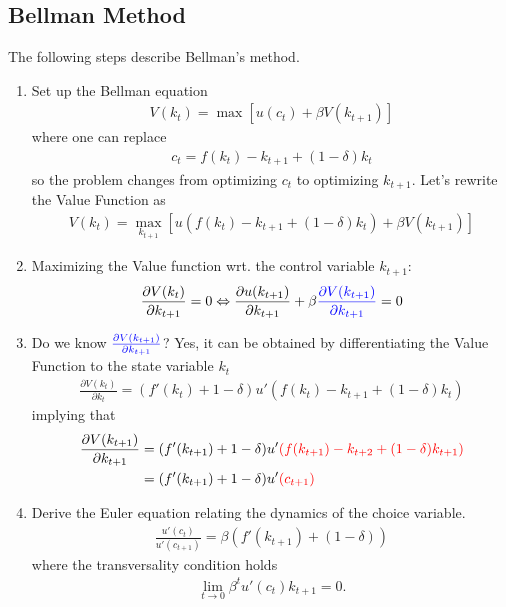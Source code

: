 \documentclass[11pt,a4paper]{book}
\newcommand{\red}[1]{\textcolor{red}{#1}}
\newcommand{\blue}[1]{\textcolor{blue}{#1}}
\theoremstyle{definition}\newtheorem{definition}{Definition}
\theoremstyle{definition}\newtheorem{fact}{Fact}
\theoremstyle{definition}\newtheorem{remark}{Remark}
\theoremstyle{definition}\newtheorem{ex}{Ex.}
\theoremstyle{definition}\newtheorem{project}{Project}
\theoremstyle{definition}\newtheorem{problem}{Problem}
\theoremstyle{definition}\newtheorem{example}{Example}
\numberwithin{theorem}{section}
\numberwithin{corollary}{chapter}
\numberwithin{assumption}{chapter}
\numberwithin{definition}{chapter}
\numberwithin{prop}{chapter}
\numberwithin{notation}{chapter}
\numberwithin{problem}{chapter}
\numberwithin{example}{chapter}
\numberwithin{fact}{chapter}
\numberwithin{ex}{chapter}
\begin{document}
	\subsection{Bellman Method}
	The following steps describe Bellman's method.
	\begin{enumerate}
		\item Set up the Bellman equation
		\begin{align*}
			V(k_t) = \max \left[ u(c_t) + \beta V(k_{t+1}) \right]
		\end{align*}
		where one can replace
		\begin{align*}
			c_t = f(k_t) - k_{t+1} + (1-\delta) k_t
		\end{align*}
		so the problem changes from optimizing $c_t$ to optimizing $k_{t+1}$. Let's rewrite the Value Function as
		\begin{align*}
			V(k_t) = \max_{k_{t+1}} \left[ u(f(k_t) - k_{t+1} + (1-\delta)k_t) +\beta V(k_{t+1}) \right] 
		\end{align*}
		\item Maximizing the Value function wrt. the control variable $k_{t+1}$:
		\begin{align*}
			\frac{\partial V(k_t)}{\partial k_{t+1}} = 0 \Leftrightarrow \frac{\partial u(k_{t+1})}{\partial k_{t+1}} + \beta \blue{\frac{\partial V(k_{t+1})}{\partial k_{t+1}}} = 0 
		\end{align*}
		\item Do we know $\blue{\frac{\partial V(k_{t+1})}{\partial k_{t+1}}}$? Yes, it can be obtained by differentiating the Value Function to the state variable $k_t$
		\begin{align*}
			\frac{\partial V(k_t)}{\partial k_t} = (f'(k_t) + 1-\delta) u'( f(k_t) - k_{t+1} + (1-\delta)k_t ) 
		\end{align*}
		implying that
		\begin{align*}
			\frac{\partial V(k_{t+1})}{\partial k_{t+1}} &= (f'(k_{t+1}) + 1-\delta) u'\red{( f(k_{t+1}) - k_{t+2} + (1-\delta)k_{t+1} )} \\
			&= (f'(k_{t+1}) + 1-\delta)u'\red{ (c_{t+1})}
		\end{align*}
		\item Derive the Euler equation relating the dynamics of the choice variable.
		\begin{align*}
			\frac{u'(c_t)}{u'(c_{t+1})} = \beta (f'(k_{t+1}) + (1-\delta))
		\end{align*}
		where the transversality condition holds
		\begin{align*}
			\lim_{t\to 0} \beta^t u'(c_t) k_{t+1} = 0.
		\end{align*}
	\end{enumerate}
\end{document}
